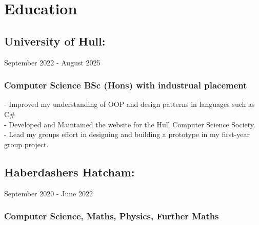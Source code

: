 \section{Education}

\subsection{University of Hull:} September 2022 - August 2025 \\

\subsubsection{Computer Science BSc (Hons) with industrual placement}

-\: Improved my understanding of OOP and design patterns in languages such as C\#\\
-\: Developed and Maintained the website for the Hull Computer Science Society. \\
-\: Lead my groups effort in designing and building a prototype in my first-year group project. 


\vspace{10pt}
\subsection{Haberdashers Hatcham:} September 2020 - June 2022 \\ 

\subsubsection{Computer Science, Maths, Physics, Further Maths}